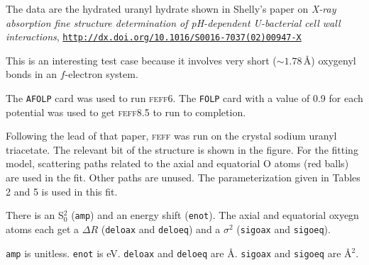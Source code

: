 \documentclass{article}
\begin{document}
The data are the hydrated uranyl hydrate shown in Shelly's paper on
\textit{X-ray absorption fine structure determination of pH-dependent
  U-bacterial cell wall interactions},
\href{http://dx.doi.org/10.1016/S0016-7037(02)00947-X}
{\texttt{http://dx.doi.org/10.1016/S0016-7037(02)00947-X}}

This is an interesting test case because it involves very short
($\sim1.78$\,\AA) oxygenyl bonds in an $f$-electron system.

The \texttt{AFOLP} card was used to run \textsc{feff}6.  The
\texttt{FOLP} card with a value of 0.9 for each potential was used to
get \textsc{feff}8.5 to run to completion.

Following the lead of that paper, \textsc{feff} was run on the crystal
sodium uranyl triacetate.  The relevant bit of the structure is shown
in the figure.  For the fitting model, scattering paths related to the
axial and equatorial O atoms (red balls) are used in the fit.  Other
paths are unused.  The parameterization given in Tables 2 and 5 is
used in this fit.

There is an S$_0^2$ (\texttt{amp}) and an energy shift
(\texttt{enot}).  The axial and equatorial oxyegn atoms each get a
$\Delta R$ (\texttt{deloax} and \texttt{deloeq}) and a $\sigma^2$
(\texttt{sigoax} and \texttt{sigoeq}).

\texttt{amp} is unitless.  \texttt{enot} is eV.
\texttt{deloax} and \texttt{deloeq} are \AA.
\texttt{sigoax} and \texttt{sigoeq} are \AA$^2$.

\renewcommand{\feffMaterial}{uranyl}
\renewcommand{\feffRone}{2.5}
\renewcommand{\feffRtwo}{2.9}
\renewcommand{\feffRthree}{4.0}
\renewcommand{\feffRfour}{5.2}
\renewcommand{\feffRfive}{6.8}
\renewcommand{\feffFirst}{}

\small

\scfsevenplots
\end{document}
